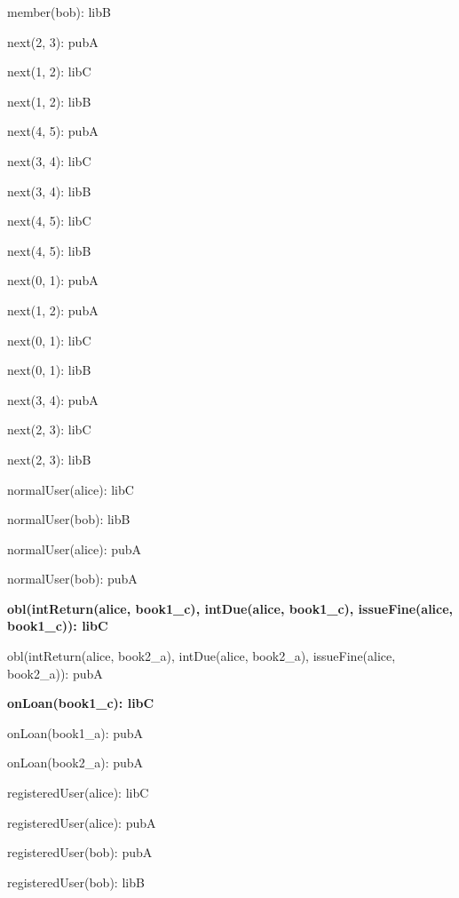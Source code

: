 \documentclass{article}
\newenvironment{states}
        {\begin{minipage}{\tableWidth}\raggedright\begin{description}[align=left,leftmargin=1em,noitemsep,labelsep=\parindent]}
        {\end{description}\end{minipage}}
\begin{document}
{\begin{states}
\item{{member(\allowbreak{}bob): libB}}
\item{{next(\allowbreak{}2, 3): pubA}}
\item{{next(\allowbreak{}1, 2): libC}}
\item{{next(\allowbreak{}1, 2): libB}}
\item{{next(\allowbreak{}4, 5): pubA}}
\item{{next(\allowbreak{}3, 4): libC}}
\item{{next(\allowbreak{}3, 4): libB}}
\item{{next(\allowbreak{}4, 5): libC}}
\item{{next(\allowbreak{}4, 5): libB}}
\item{{next(\allowbreak{}0, 1): pubA}}
\item{{next(\allowbreak{}1, 2): pubA}}
\item{{next(\allowbreak{}0, 1): libC}}
\item{{next(\allowbreak{}0, 1): libB}}
\item{{next(\allowbreak{}3, 4): pubA}}
\item{{next(\allowbreak{}2, 3): libC}}
\item{{next(\allowbreak{}2, 3): libB}}
\item{{normalUser(\allowbreak{}alice): libC}}
\item{{normalUser(\allowbreak{}bob): libB}}
\item{{normalUser(\allowbreak{}alice): pubA}}
\item{{normalUser(\allowbreak{}bob): pubA}}
\item\textbf{{obl(\allowbreak{}intReturn(\allowbreak{}alice, book1\_c), intDue(\allowbreak{}alice, book1\_c), issueFine(\allowbreak{}alice, book1\_c)): libC}}
\item{{obl(\allowbreak{}intReturn(\allowbreak{}alice, book2\_a), intDue(\allowbreak{}alice, book2\_a), issueFine(\allowbreak{}alice, book2\_a)): pubA}}
\item\textbf{{onLoan(\allowbreak{}book1\_c): libC}}
\item{{onLoan(\allowbreak{}book1\_a): pubA}}
\item{{onLoan(\allowbreak{}book2\_a): pubA}}
\item{{registeredUser(\allowbreak{}alice): libC}}
\item{{registeredUser(\allowbreak{}alice): pubA}}
\item{{registeredUser(\allowbreak{}bob): pubA}}
\item{{registeredUser(\allowbreak{}bob): libB}}
\end{states}}
\end{document}
